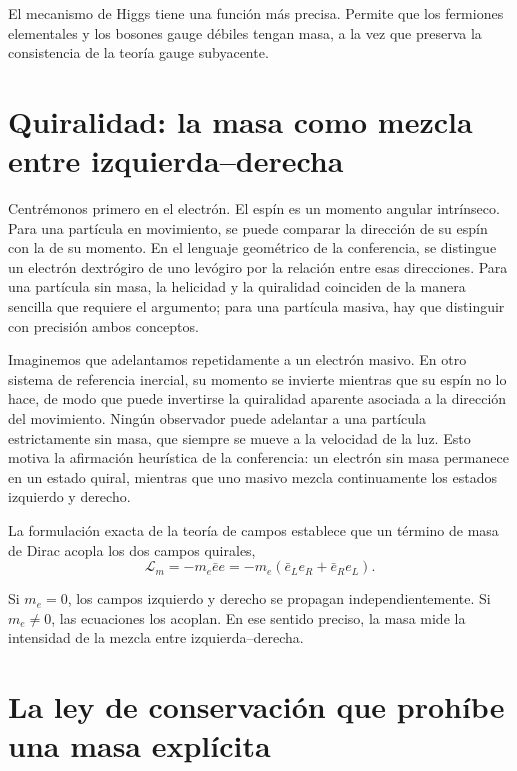 El mecanismo de Higgs tiene una función más precisa. Permite que los fermiones elementales y los bosones gauge débiles tengan masa, a la vez que preserva la consistencia de la teoría gauge subyacente.

\section{Quiralidad: la masa como mezcla entre izquierda--derecha}

Centrémonos primero en el electrón. El espín es un momento angular intrínseco. Para una partícula en movimiento, se puede comparar la dirección de su espín con la de su momento. En el lenguaje geométrico de la conferencia, se distingue un electrón dextrógiro de uno levógiro por la relación entre esas direcciones. Para una partícula sin masa, la helicidad y la quiralidad coinciden de la manera sencilla que requiere el argumento; para una partícula masiva, hay que distinguir con precisión ambos conceptos.

Imaginemos que adelantamos repetidamente a un electrón masivo. En otro sistema de referencia inercial, su momento se invierte mientras que su espín no lo hace, de modo que puede invertirse la quiralidad aparente asociada a la dirección del movimiento. Ningún observador puede adelantar a una partícula estrictamente sin masa, que siempre se mueve a la velocidad de la luz. Esto motiva la afirmación heurística de la conferencia: un electrón sin masa permanece en un estado quiral, mientras que uno masivo mezcla continuamente los estados izquierdo y derecho.

La formulación exacta de la teoría de campos establece que un término de masa de Dirac acopla los dos campos quirales,
\begin{equation}
\mathcal L_m
=
-m_e\bar e e
=
-m_e
\left(
  \bar e_L e_R
  +
  \bar e_R e_L
\right).
\end{equation}

Si $m_e=0$, los campos izquierdo y derecho se propagan independientemente. Si $m_e\ne0$, las ecuaciones los acoplan. En ese sentido preciso, la masa mide la intensidad de la mezcla entre izquierda--derecha.

\section{La ley de conservación que prohíbe una masa explícita}

